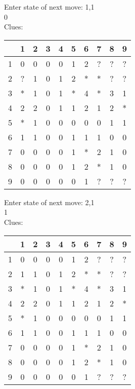Enter state of next move: 1,1\\
0\\
Clues:\\
\begin{tabular}{|c|c|c|c|c|c|c|c|c|c|}
\hline
  & 1 & 2 & 3 & 4 & 5 & 6 & 7 & 8 & 9\\
\hline
1 & 0 & 0 & 0 & 0 & 1 & 2 & ? & ? & ?\\
\hline
2 & ? & 1 & 0 & 1 & 2 & * & * & ? & ?\\
\hline
3 & * & 1 & 0 & 1 & * & 4 & * & 3 & 1\\
\hline
4 & 2 & 2 & 0 & 1 & 1 & 2 & 1 & 2 & *\\
\hline
5 & * & 1 & 0 & 0 & 0 & 0 & 0 & 1 & 1\\
\hline
6 & 1 & 1 & 0 & 0 & 1 & 1 & 1 & 0 & 0\\
\hline
7 & 0 & 0 & 0 & 0 & 1 & * & 2 & 1 & 0\\
\hline
8 & 0 & 0 & 0 & 0 & 1 & 2 & * & 1 & 0\\
\hline
9 & 0 & 0 & 0 & 0 & 0 & 1 & ? & ? & ?\\
\hline
\end{tabular}

Enter state of next move: 2,1\\
1\\
Clues:\\
\begin{tabular}{|c|c|c|c|c|c|c|c|c|c|}
\hline
  & 1 & 2 & 3 & 4 & 5 & 6 & 7 & 8 & 9\\
\hline
1 & 0 & 0 & 0 & 0 & 1 & 2 & ? & ? & ?\\
\hline
2 & 1 & 1 & 0 & 1 & 2 & * & * & ? & ?\\
\hline
3 & * & 1 & 0 & 1 & * & 4 & * & 3 & 1\\
\hline
4 & 2 & 2 & 0 & 1 & 1 & 2 & 1 & 2 & *\\
\hline
5 & * & 1 & 0 & 0 & 0 & 0 & 0 & 1 & 1\\
\hline
6 & 1 & 1 & 0 & 0 & 1 & 1 & 1 & 0 & 0\\
\hline
7 & 0 & 0 & 0 & 0 & 1 & * & 2 & 1 & 0\\
\hline
8 & 0 & 0 & 0 & 0 & 1 & 2 & * & 1 & 0\\
\hline
9 & 0 & 0 & 0 & 0 & 0 & 1 & ? & ? & ?\\
\hline
\end{tabular}

